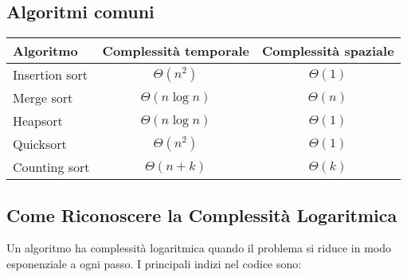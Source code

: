 \subsection{Algoritmi comuni}

\begin{center}
    \begin{tabular}{|l|c|c|}
        \hline
        \textbf{Algoritmo} & \textbf{Complessità temporale} & \textbf{Complessità spaziale} \\
        \hline
        Insertion sort & $\Theta(n^2)$ & $\Theta(1)$ \\
        \hline
        Merge sort & $\Theta(n \log n)$ & $\Theta(n)$ \\
        \hline
        Heapsort & $\Theta(n \log n)$ & $\Theta(1)$ \\
        \hline
        Quicksort & $\Theta(n^2)$ & $\Theta(1)$ \\
        \hline
        Counting sort & $\Theta(n+k)$ & $\Theta(k)$ \\
        \hline
    \end{tabular}
\end{center}


\subsection{Come Riconoscere la Complessità Logaritmica}

Un algoritmo ha complessità logaritmica quando il problema si riduce in modo esponenziale a ogni passo. I principali indizi nel codice sono:

